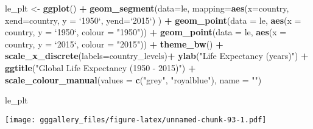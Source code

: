 \documentclass[]{book}
\newenvironment{Shaded}{\begin{snugshade}}{\end{snugshade}}
\newcommand{\DataTypeTok}[1]{\textcolor[rgb]{0.13,0.29,0.53}{#1}}
\newcommand{\KeywordTok}[1]{\textcolor[rgb]{0.13,0.29,0.53}{\textbf{#1}}}
\newcommand{\NormalTok}[1]{#1}
\newcommand{\OperatorTok}[1]{\textcolor[rgb]{0.81,0.36,0.00}{\textbf{#1}}}
\newcommand{\StringTok}[1]{\textcolor[rgb]{0.31,0.60,0.02}{#1}}
\begin{document}
\begin{Shaded}
\begin{Highlighting}[]
\NormalTok{le_plt <-}\StringTok{ }\KeywordTok{ggplot}\NormalTok{() }\OperatorTok{+}
\StringTok{  }\KeywordTok{geom_segment}\NormalTok{(}\DataTypeTok{data=}\NormalTok{le, }\DataTypeTok{mapping=}\KeywordTok{aes}\NormalTok{(}\DataTypeTok{x=}\NormalTok{country, }\DataTypeTok{xend=}\NormalTok{country,}
                                    \DataTypeTok{y =} \StringTok{`}\DataTypeTok{1950}\StringTok{`}\NormalTok{, }\DataTypeTok{yend=}\StringTok{`}\DataTypeTok{2015}\StringTok{`}\NormalTok{) ) }\OperatorTok{+}
\StringTok{  }\KeywordTok{geom_point}\NormalTok{(}\DataTypeTok{data =}\NormalTok{ le, }\KeywordTok{aes}\NormalTok{(}\DataTypeTok{x =}\NormalTok{ country, }\DataTypeTok{y =} \StringTok{`}\DataTypeTok{1950}\StringTok{`}\NormalTok{, }\DataTypeTok{colour =} \StringTok{"1950"}\NormalTok{)) }\OperatorTok{+}
\StringTok{  }\KeywordTok{geom_point}\NormalTok{(}\DataTypeTok{data =}\NormalTok{ le, }\KeywordTok{aes}\NormalTok{(}\DataTypeTok{x =}\NormalTok{ country, }\DataTypeTok{y =} \StringTok{`}\DataTypeTok{2015}\StringTok{`}\NormalTok{, }\DataTypeTok{colour =} \StringTok{"2015"}\NormalTok{)) }\OperatorTok{+}
\StringTok{  }\KeywordTok{theme_bw}\NormalTok{() }\OperatorTok{+}
\StringTok{  }\KeywordTok{scale_x_discrete}\NormalTok{(}\DataTypeTok{labels=}\NormalTok{country_levels)}\OperatorTok{+}
\StringTok{  }\KeywordTok{ylab}\NormalTok{(}\StringTok{"Life Expectancy (years)"}\NormalTok{) }\OperatorTok{+}
\StringTok{  }\KeywordTok{ggtitle}\NormalTok{(}\StringTok{"Global Life Expectancy (1950 - 2015)"}\NormalTok{) }\OperatorTok{+}
\StringTok{  }\KeywordTok{scale_colour_manual}\NormalTok{(}\DataTypeTok{values =} \KeywordTok{c}\NormalTok{(}\StringTok{"grey"}\NormalTok{, }\StringTok{"royalblue"}\NormalTok{), }\DataTypeTok{name =} \StringTok{""}\NormalTok{) }
  
\NormalTok{le_plt}
\end{Highlighting}
\end{Shaded}

\texttt{[image: gggallery\_files/figure-latex/unnamed-chunk-93-1.pdf]}
\end{document}
